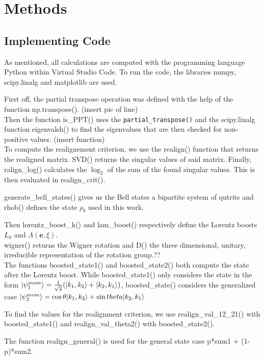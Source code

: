 \chapter{Methods}

\section{Implementing Code}

As mentioned, all calculations are computed with the programming language Python within Virtual Studio Code.
To run the code, the libraries numpy, scipy.linalg and matplotlib are used.

First off, the partial transpose operation was defined with the help of the function np.transpose().
(insert pic of line)\\
Then the function is\_PPT() uses the \verb|partial_transpose()| and the scipy.linalg function eigenvalsh() to find the eigenvalues
that are then checked for non-positive values.
(insert function)\\
To compute the realignement criterion, we use the realign() function that returns the realigned matrix. SVD() returns the singular values of said matrix.
Finally, ralign\_log() calculates the $\log_2$ of the sum of the found singular values. This is then evaluated in realign\_crit().

generate\_bell\_states() gives us the Bell states a bipartite system of qutrits and rhob() defines the state $\rho_b$ used in this work.

Then lorentz\_boost\_k() and lam\_boost() respectively define the Lorentz boosts $L_k$ and $\Lambda(\textbf{e},\xi)$.\\
wigner() returns the Wigner rotation and D() the three dimensional, unitary, irreducible representation of the rotation group.??\\

The functions boosted\_state1() and boosted\_state2() both compute the state after the Lorentz boost. While boosted\_state1() only considers the state in the form
$\lvert\psi_1^{mom}\rangle = \frac{1}{\sqrt{2}}(\lvert k_1,k_2\rangle + \lvert k_2,k_1\rangle)$, boosted\_state() considers the generalized case $\lvert\psi_2^{mom}\rangle = \cos{\theta}\lvert k_1,k_2\rangle + \sin{theta}\lvert k_2,k_1\rangle$

To find the values for the realignment criterion, we use realign\_val\_12\_21() with boosted\_state1() and realign\_val\_theta2() with boosted\_state2().

The function realign\_general() is used for the general state case p*sum1 + (1-p)*sum2.\cite{horodecki1998mixed}\cite{hiesmayr2024bipartite}

